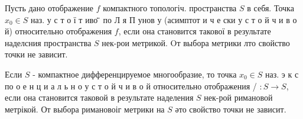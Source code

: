 \documentclass[10pt]{article}
\begin{document}
Пусть дано отображение $f$ компактного топологіч. пространства $S$ в себя. Точка $x_{0} \in S$ наз. у с т о ї т иво ̈̈̈ по Л я П унов у (асимптот и ч е ски у с т о й ч и в о й) относительно отображения $f$, если она становится такової в результате наделсния пространства $S$ нек-рои метрикой. Oт выбора метрики лто свойство точки не зависит.



Если $S$ - компактное дифференцируемое многообразие, то точка $x_{0} \in S$ наз. э $к$ с по о е н ц и а л ь н о у с т о й ч и в о й относительно отображения / $: S \rightarrow S$, если она становится таковой в результате наделения $S$ нек-рой римановой метрікой. От выбора римановоіг метрики на $S$ әто свойство точки не зависит.
\end{document}
